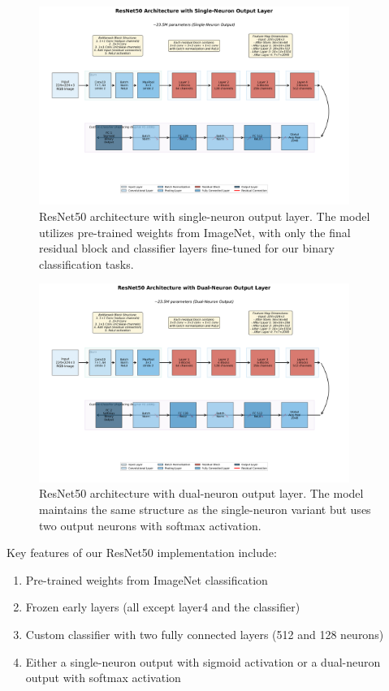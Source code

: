 \begin{figure}[!htbp]
\centering
\includegraphics[width=0.9\textwidth]{figures/resnet50_1neuron_architecture.png}
\caption{ResNet50 architecture with single-neuron output layer. The model utilizes pre-trained weights from ImageNet, with only the final residual block and classifier layers fine-tuned for our binary classification tasks.}
\label{fig:resnet50_arch_single}
\end{figure}

\begin{figure}[!htbp]
\centering
\includegraphics[width=0.9\textwidth]{figures/resnet50_2neuron_architecture.png}
\caption{ResNet50 architecture with dual-neuron output layer. The model maintains the same structure as the single-neuron variant but uses two output neurons with softmax activation.}
\label{fig:resnet50_arch_dual}
\end{figure}

Key features of our ResNet50 implementation include:
\begin{enumerate}
\item Pre-trained weights from ImageNet classification
\item Frozen early layers (all except layer4 and the classifier)
\item Custom classifier with two fully connected layers (512 and 128 neurons)
\item Either a single-neuron output with sigmoid activation or a dual-neuron output with softmax activation
\end{enumerate}

